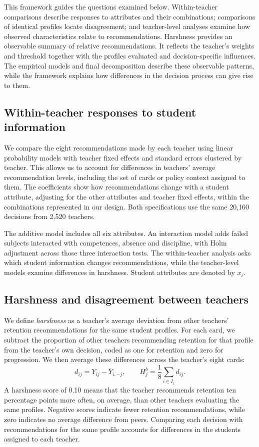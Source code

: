 This framework guides the questions examined below. Within-teacher comparisons describe responses to attributes and their combinations; comparisons of identical profiles locate disagreement; and teacher-level analyses examine how observed characteristics relate to recommendations. Harshness provides an observable summary of relative recommendations. It reflects the teacher's weights and threshold together with the profiles evaluated and decision-specific influences. The empirical models and final decomposition describe these observable patterns, while the framework explains how differences in the decision process can give rise to them.

\subsection{Within-teacher responses to student information}
We compare the eight recommendations made by each teacher using linear probability models with teacher fixed effects and standard errors clustered by teacher. This allows us to account for differences in teachers' average recommendation levels, including the set of cards or policy context assigned to them. The coefficients show how recommendations change with a student attribute, adjusting for the other attributes and teacher fixed effects, within the combinations represented in our design. Both specifications use the same 20,160 decisions from 2,520 teachers.

The additive model includes all six attributes. An interaction model adds failed subjects interacted with competences, absence and discipline, with Holm adjustment across those three interaction tests. The within-teacher analysis asks which student information changes recommendations, while the teacher-level models examine differences in harshness. Student attributes are denoted by $x_i$.

\subsection{Harshness and disagreement between teachers}
We define \textit{harshness} as a teacher's average deviation from other teachers' retention recommendations for the same student profiles. For each card, we subtract the proportion of other teachers recommending retention for that profile from the teacher's own decision, coded as one for retention and zero for progression. We then average these differences across the teacher's eight cards:
\[
d_{ij}=Y_{ij}-\overline Y_{i,-j},\qquad
H^b_j=\frac{1}{8}\sum_{i\in I_j}d_{ij}.
\]
A harshness score of 0.10 means that the teacher recommends retention ten percentage points more often, on average, than other teachers evaluating the same profiles. Negative scores indicate fewer retention recommendations, while zero indicates no average difference from peers. Comparing each decision with recommendations for the same profile accounts for differences in the students assigned to each teacher.

